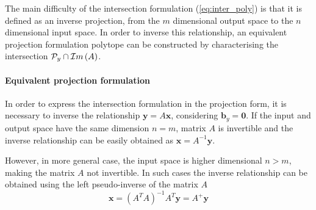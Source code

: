 The main difficulty of the intersection formulation (\ref{eq:inter_poly}) is that it is defined as an inverse projection, from the $m$ dimensional output space to the $n$ dimensional input space\cite{LARSON2013}. In order to inverse this relationship, an equivalent projection formulation polytope can be constructed by characterising the intersection $\mathcal{P}_y\cap \mathcal{I}m\left(A\right)$. 

\paragraph*{Equivalent projection formulation}\label{par:equivalent_proj} In order to express the intersection formulation in the projection form, it is necessary to inverse the relationship $\bm{y}=A\bm{x}$, considering $\bm{b}_y=\bm{0}$. If the input and output space have the same dimension $n=m$, matrix $A$ is invertible and the inverse relationship can be easily obtained as $\bm{x} = A^{-1}\bm{y}$. 


However, in more general case, the input space is higher dimensional $n>m$, making the matrix $A$ not invertible. In such cases the inverse relationship can be obtained using the left pseudo-inverse of the matrix $A$
\begin{equation}
    \bm{x} = (A^TA)^{-1}A^T\bm{y} = A^+\bm{y}
    \label{eq:pseudoinverse_equation}
\end{equation}

